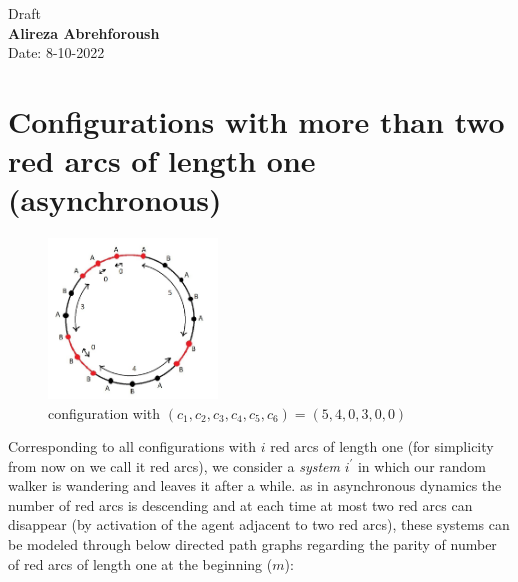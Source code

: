 \documentclass[]{book}
\theoremstyle{definition}
\begin{document}
\begin{center}
{\Large Draft}\\
\textbf{Alireza Abrehforoush}\\ %
Date: 8-10-2022 %
\end{center}
\vspace{0.2 cm}
\section{Configurations with more than two red arcs of length one (asynchronous)}
\begin{figure}[H]
    \centering
    \includegraphics[width=0.4\textwidth]{figures/pic2.jpg}
    \caption{configuration with $\left(c_{1}, c_{2}, c_{3}, c_{4}, c_{5}, c_{6}\right) = \left(5, 4, 0, 3, 0, 0\right)$}
    \label{fig:mesh2}
\end{figure}
Corresponding to all configurations with $i$ red arcs of length one (for simplicity from now on we call it red arcs), we consider a \emph{system} $i^\prime$ in which our random walker is wandering and leaves it after a while. as in asynchronous dynamics the number of red arcs is descending and at each time at most two red arcs can disappear (by activation of the agent adjacent to two red arcs), these systems can be modeled through below directed path graphs regarding the parity of number of red arcs of length one at the beginning ($m$):
\end{document}
